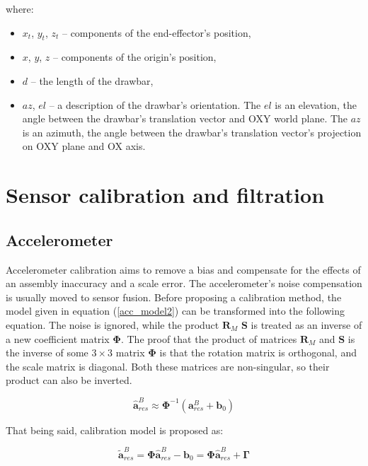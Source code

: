 where:
\begin{itemize}
	\item $x_t$, $y_t$, $z_t$ -- components of the end-effector's position,
	\item $x$, $y$, $z$ -- components of the origin's position,
	\item $d$ -- the length of the drawbar,
	\item $az$, $el$ -- a description of the drawbar's orientation. The $el$ is an elevation, the angle between the drawbar's translation vector and OXY world plane. The $az$ is an azimuth, the angle between the drawbar's translation vector's projection on OXY plane and OX axis.
\end{itemize}



\section{Sensor calibration and filtration}



\subsection{Accelerometer}

Accelerometer calibration aims to remove a bias and compensate for the effects of an assembly inaccuracy and a scale error. The accelerometer's noise compensation is usually moved to sensor fusion. Before proposing a calibration method, the model given in equation (\ref{acc_model2}) can be transformed into the following equation. The noise is ignored, while the product $\bm{R}_M$ $\bm{S}$ is treated as an inverse of a new coefficient matrix $\bm{\Phi}$. The proof that the product of matrices $\bm{R}_M$ and $\bm{S}$ is the inverse of some $3 \times 3$ matrix $\bm{\Phi}$ is that the rotation matrix is orthogonal, and the scale matrix is diagonal. Both these matrices are non-singular, so their product can also be inverted.

\begin{equation}
	\bm{\hat{a}}_{res}^B \approx \bm{\Phi}^{-1} \left( \bm{a}_{res}^B + \bm{b}_0 \right)
	\label{acc_calib}
\end{equation}

That being said, calibration model is proposed as:

\begin{equation}
	\bm{\tilde{a}}_{res}^B = \bm{\Phi} \bm{\hat{a}}_{res}^B - \bm{b}_0 = \bm{\Phi} \bm{\hat{a}}_{res}^B + \bm{\Gamma}
	\label{acc_calib2}
\end{equation}

